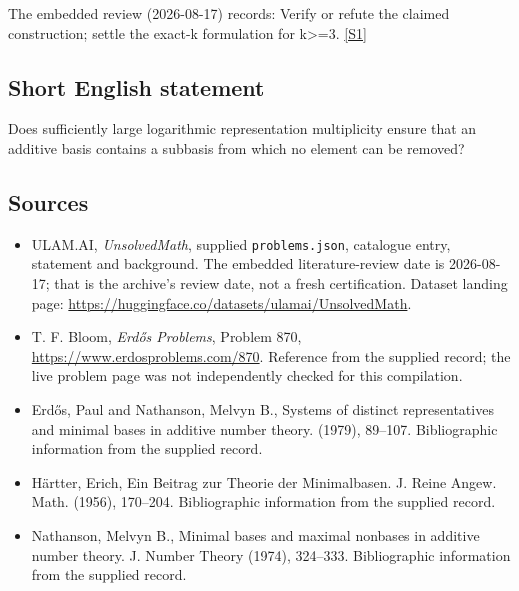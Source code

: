 \documentclass[11pt,a4paper]{article}
\newcommand{\sref}[2]{\hyperlink{source:#1:#2}{[S#2]}}
\begin{document}
The embedded review (2026-08-17) records: Verify or refute the claimed construction; settle the exact-k formulation for k>=3. \sref{statement}{1}

\subsection{Short English statement}

Does sufficiently large logarithmic representation multiplicity ensure that an additive basis contains a subbasis from which no element can be removed?

\subsection{Sources}

{\small

\begin{itemize}

\item[\hypertarget{source:statement:1}{S1}] ULAM.AI, \emph{UnsolvedMath}, supplied \texttt{problems.json}, catalogue entry, statement and background. The embedded literature-review date is 2026-08-17; that is the archive’s review date, not a fresh certification. Dataset landing page: \url{https://huggingface.co/datasets/ulamai/UnsolvedMath}.

\item[\hypertarget{source:statement:2}{S2}] T. F. Bloom, \emph{Erdős Problems}, Problem 870, \url{https://www.erdosproblems.com/870}. Reference from the supplied record; the live problem page was not independently checked for this compilation.

\item[\hypertarget{source:statement:3}{S3}] Erd\H{o}s, Paul and Nathanson, Melvyn B., Systems of distinct representatives and minimal bases in additive number theory. (1979), 89--107. Bibliographic information from the supplied record.

\item[\hypertarget{source:statement:4}{S4}] H\"{a}rtter, Erich, Ein Beitrag zur {T}heorie der {M}inimalbasen. J. Reine Angew. Math. (1956), 170--204. Bibliographic information from the supplied record.

\item[\hypertarget{source:statement:5}{S5}] Nathanson, Melvyn B., Minimal bases and maximal nonbases in additive number theory. J. Number Theory (1974), 324--333. Bibliographic information from the supplied record.

\end{itemize}

}

\label{end:statement}
\end{document}
